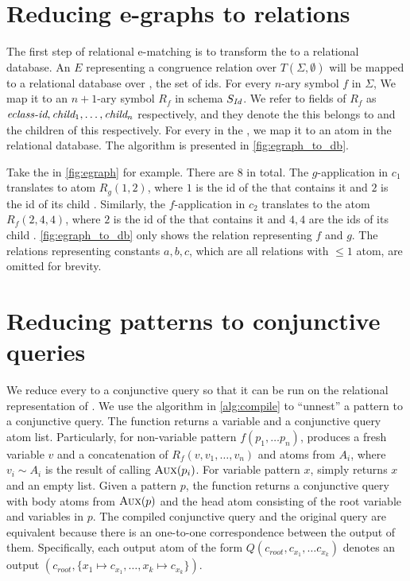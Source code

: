 \section{Reducing e-graphs to relations}

The first step of relational e-matching is to transform the \egraph to a relational database. 
An \egraph $E$ representing a congruence relation over $T(\Sigma,\emptyset)$ will be mapped to a relational database over \id, the set of \eclass ids. 
For every $n$-ary symbol $f$ in $\Sigma$, We map it to an $n+1$-ary symbol $R_f$ in schema $S_{\textit{Id}}$.
We refer to fields of $R_f$ as $\textit{eclass-id},\textit{child}_1,\ldots,\textit{child}_n$ respectively, and they denote the \eclass this \enode belongs to and the children \eclasses of this \enode respectively.
For every \enode in the \egraph, we map it to an atom in the relational database.
The algorithm is presented in \autoref{fig:egraph_to_db}. 

Take the \egraph in \autoref{fig:egraph} for example. There are 8 \eclasses in total. The $g$-application \enode in \eclass $c_1$ translates to atom $R_g(1, 2)$, where $1$ is the id of the \eclass that contains it and $2$ is the id of its child \eclass. Similarly, the $f$-application \enode in \eclass $c_2$ translates to the atom $R_f(2, 4, 4)$, where $2$ is the id of the \eclass that contains it and $4,4$ are the ids of its child \eclasses. \autoref{fig:egraph_to_db} only shows the relation representing $f$ and $g$. The relations representing constants $a,b,c$, which are all relations with $\leq 1$ atom, are omitted for brevity.

\section{Reducing \ematching patterns to conjunctive queries}
\label{sec:pattern_to_cq}

We reduce every \ematching to a conjunctive query so that it can be run on the relational representation of \egraphs. 
We use the algorithm in \autoref{alg:compile} to ``unnest'' a pattern to a conjunctive query. The \aux{} function returns a variable and a conjunctive query atom list. 
Particularly, for non-variable pattern $f(p_1,\ldots p_n)$, \aux{} produces a fresh variable $v$ and a concatenation of $R_f(v, v_1,\ldots, v_n)$ and atoms from $A_i$, where $v_i\sim A_i$ is the result of calling $\textsc{Aux}(p_i)$. For variable pattern $x$, \aux{} simply returns $x$ and an empty list.
Given a pattern $p$, the \compile{} function returns a conjunctive query with body atoms from $\textsc{Aux}(p)$ and the head atom consisting of the root variable and variables in $p$. The compiled conjunctive query and the original \ematching query are equivalent because there is an one-to-one correspondence between the output of them. Specifically, each output atom of the form $Q(c_\textit{root}, c_{x_1},\ldots c_{x_k})$ denotes an \ematching output $\left(c_\textit{root}, \{x_1\mapsto c_{x_1},\ldots,x_k\mapsto c_{x_k} \}\right)$.

